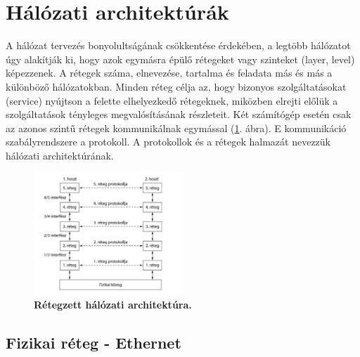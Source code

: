 \documentclass[12pt]{article}
\theoremstyle{plain}
\begin{document}
\begin{figure}[H]
\end{figure}

\section{Hálózati architektúrák}

A hálózat tervezés bonyolultságának csökkentése érdekében, a legtöbb hálózatot úgy alakítják ki, hogy azok egymásra épülő rétegeket vagy szinteket (layer, level) képezzenek. A rétegek száma, elnevezése, tartalma és feladata más és más a különböző hálózatokban. Minden réteg célja az, hogy bizonyos szolgáltatásokat (service) nyújtson a felette elhelyezkedő rétegeknek, miközben elrejti előlük a szolgáltatások tényleges megvalósításának részleteit. Két számítógép esetén csak az azonos szintű rétegek kommunikálnak egymással (\ref{fig:layer}. ábra). E kommunikáció szabályrendszere a protokoll. A protokollok és a rétegek halmazát nevezzük hálózati architektúrának.


\begin{figure}[H]
    \begin{center}
    \includegraphics[width=0.5\textwidth]{media/layer.png}
    \caption{\textbf{Rétegzett hálózati architektúra.}} 
    \label{fig:layer}
    \end{center}
\end{figure}

\subsection{Fizikai réteg - Ethernet}
\end{document}
